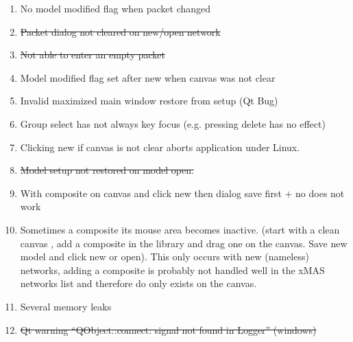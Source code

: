 \begin{enumerate} \label{sec:bug-list}
\item	No model modified flag when packet changed
\item	\st{Packet dialog not cleared on new/open network}
\item \st{Not able to enter an empty packet}
\item	Model modified flag set after new when canvas was not clear
\item	Invalid maximized main window restore from setup (Qt Bug)
\item	Group select has not always key focus (e.g. pressing delete has no effect)
\item	Clicking new if canvas is not clear aborts application under Linux.
\item	\st{Model setup not restored on model open.}
\item With composite on canvas and click new then dialog save first $+$ no does not
work
\item Sometimes a composite its mouse area becomes inactive. (start with a clean
canvas , add a composite in the library and drag one on the canvas. Save new
model and click new or open). This only occurs with new (nameless) networks,
adding a composite is probably not handled well in the xMAS networks list and
therefore do only exists on the canvas.
\item	Several memory leaks
\item \st{Qt warning ``QObject::connect: signal not found in Logger'' (windows)}
\end{enumerate}
